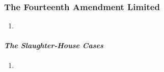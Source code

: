 \subsubsection{The Fourteenth Amendment Limited}

\begin{enumerate}
    \item %
\end{enumerate}

\paragraph{\emph{The Slaughter-House Cases}}

\begin{enumerate}
    \item %
\end{enumerate}


